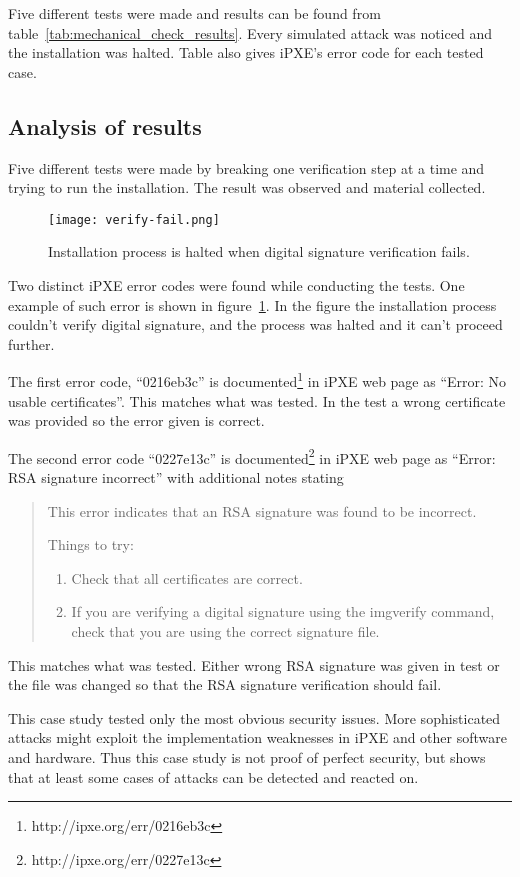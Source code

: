 Five different tests were made and results can be found from
table~\ref{tab:mechanical_check_results}. Every simulated attack was
noticed and the installation was halted. Table also gives iPXE's error
code for each tested case.


\subsection{Analysis of results}

Five different tests were made by breaking one verification step at a
time and trying to run the installation. The result was observed and
material collected.

\begin{figure}[h]
  \texttt{[image: verify-fail.png]}
  \caption{Installation process is halted when digital signature
    verification fails.\label{fig:verify-fail}}
\end{figure}

Two distinct iPXE error codes were found while conducting the
tests. One example of such error is shown in
figure~\ref{fig:verify-fail}. In the figure the installation process
couldn't verify digital signature, and the process was halted and it
can't proceed further.

The first error code, ``0216eb3c'' is
documented\footnote{http://ipxe.org/err/0216eb3c} in iPXE web page as
``Error: No usable certificates''. This matches what was tested. In
the test a wrong certificate was provided so the error given is
correct.

The second error code ``0227e13c'' is
documented\footnote{http://ipxe.org/err/0227e13c} in iPXE web page as
``Error: RSA signature incorrect'' with additional notes stating

\begin{quote}
This error indicates that an RSA signature was found to be incorrect.

Things to try:

\begin{enumerate}
\item Check that all certificates are correct.
\item If you are verifying a digital signature using the imgverify
  command, check that you are using the correct signature file.
\end{enumerate}
\end{quote}

This matches what was tested. Either wrong RSA signature was given in
test or the file was changed so that the RSA signature verification
should fail.

This case study tested only the most obvious security issues. More
sophisticated attacks might exploit the implementation weaknesses in
iPXE and other software and hardware. Thus this case study is not
proof of perfect security, but shows that at least some cases of
attacks can be detected and reacted on.
